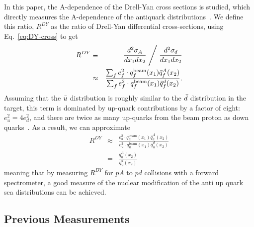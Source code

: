 In this paper, the A-dependence of the Drell-Yan cross sections is studied, which directly measures the A-dependence of the antiquark distributions~\cite{Berger:1985dr}. We define this ratio, $R^{DY}$ as the ratio of Drell-Yan differential cross-sections, using Eq.~\ref{eq:DY-cross} to get
\begin{eqnarray}
R^{DY} & \equiv & \frac{d^2\sigma_A}{dx_1 dx_2} \Biggm/ \frac{d^2\sigma_d}{dx_1 dx_2} \\
& \approx & \frac{\sum_f e_f^2 \cdot q_f^{\text{beam}}(x_1) \bar{q}_f^A(x_2)}{\sum_f e_f^2 \cdot q_f^{\text{beam}}(x_1) \bar{q}_f^d(x_2)}.
\end{eqnarray}
Assuming that the $\bar{u}$ distribution is roughly similar to the $\bar{d}$ distribution in the target, this term is dominated by up-quark contributions by a factor of eight: $e_u^2 = 4 e_d^2$, and there are twice as many up-quarks from the beam proton as down quarks~\cite{Geesaman:1995yd}. As a result, we can approximate
\begin{eqnarray}
R^{DY} & \approx & \frac{e_u^2 \cdot q_u^{\text{beam}}(x_1) \bar{q}^A_u(x_2)}{e_u^2 \cdot q_u^{\text{beam}}(x_1) \bar{q}^d_u(x_2)} \\ 
& = & \frac{\bar{q}_u^A(x_2)}{\bar{q}_u^d(x_2)}
\end{eqnarray}
meaning that by measuring $R^{DY}$ for $pA$ to $pd$ collisions with a forward spectrometer, a good measure of the nuclear modification of the anti up quark sea distributions can be achieved.

\subsection{Previous Measurements}

